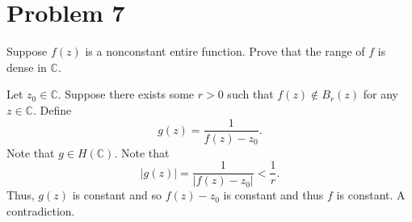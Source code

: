 \documentclass[11pt]{article}
\newcommand{\bbC}{\mathbb{C}}
\begin{document}
\newpage
\section*{Problem 7}
\begin{problem}
    Suppose $f(z)$ is a nonconstant entire function. Prove that the range of $f$ is dense in $\bbC.$
\end{problem}
\begin{solution}
    Let $z_0\in \bbC.$ Suppose there exists some $r>0$ such that $f(z)\notin B_r(z)$ for any $z\in \bbC.$ Define 
    \[g(z) = \frac{1}{f(z) - z_0}.\] Note that $g \in H(\bbC).$ Note that 
    \[|g(z)| = \frac{1}{|f(z) - z_0|} < \frac{1}{r}.\] Thus, $g(z)$ is constant and so $f(z) - z_0$ is constant and thus $f$ is constant. A contradiction.
\end{solution}
\end{document}

